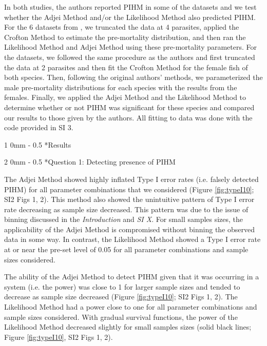 \documentclass[12pt, a4paper]{article}
\makeatletter
\renewcommand{\section}{\@startsection
{section}%
{1}%
{0mm}%
{-\baselineskip}%
{0.5\baselineskip}%
{\normalfont\bf\large}} %
\renewcommand{\subsection}{\@startsection
{subsection}%
{2}%
{0mm}%
{-\baselineskip}%
{0.5\baselineskip}%
{\normalfont\bf}} %
\makeatother
\begin{document}
In both studies, the authors reported PIHM in some of the datasets and we test whether the Adjei
Method and/or the Likelihood Method also predicted PIHM. For the 6 datasets from
\cite{Crofton1971a}, we truncated the data at 4 parasites, applied the Crofton
Method to estimate the pre-mortality distribution, and then ran the Likelihood
Method and Adjei Method using these pre-mortality parameters.  For the
\cite{Adjei1986} datasets, we followed the same procedure as the authors and
first truncated the data at 2 parasites and then fit the Crofton Method for the
female fish of both species.  Then, following the original authors' methods, we parameterized the male pre-mortality
distributions for each species with the results from the females.  Finally, we
applied the Adjei Method and the Likelihood Method to determine whether or not
PIHM was significant for these species and compared our results to those given by the authors.  All fitting to data was done with the code provided in SI 3.

\section*{Results}

\subsection*{Question 1: Detecting presence of PIHM}

The Adjei Method showed highly inflated Type I error rates (i.e. falsely detected
PIHM) for all parameter combinations that we
considered (Figure \ref{fig:typeI10}; SI2 Figs 1, 2).  This method also showed the unintuitive pattern of Type I error
rate decreasing as sample size decreased.  This pattern was due to the issue of
binning discussed in the \emph{Introduction} and \emph{SI X}. For small samples sizes, the
applicability of the Adjei Method is compromised without binning the observed
data in some way.  In contrast, the Likelihood Method showed a Type I
error rate at or near the pre-set level of 0.05 for all parameter combinations
and sample sizes considered.

The ability of the Adjei Method to detect PIHM given that it was occurring in a
system (i.e. the power) was close to 1 for larger sample sizes and tended to
decrease as sample size decreased (Figure \ref{fig:typeI10}; SI2 Figs 1, 2).  The Likelihood Method had a power close to
one for all parameter combinations and sample sizes considered.  With gradual
survival functions, the power of the Likelihood Method decreased slightly for small samples sizes (solid black lines; Figure \ref{fig:typeI10}, SI2 Figs 1, 2).
\end{document}
